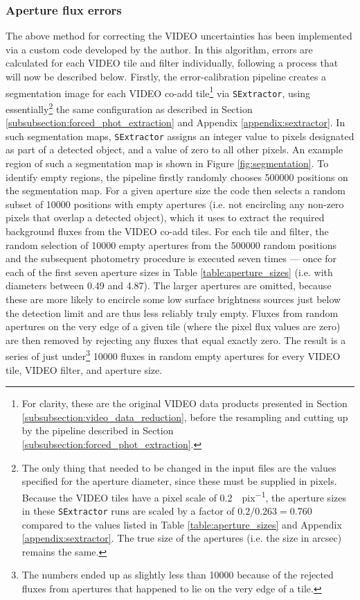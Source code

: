 \subsubsection{Aperture flux errors}\label{subsubsection:aperture_flux_errors}
The above method for correcting the VIDEO uncertainties has been implemented via a custom code developed by the author. In this algorithm, errors are calculated for each VIDEO tile and filter individually, following a process that will now be described below. Firstly, the error-calibration pipeline creates a segmentation image for each VIDEO co-add tile\footnote{For clarity, these are the original VIDEO data products presented in Section \ref{subsubsection:video_data_reduction}, before the resampling and cutting up by the \DESVIDEO pipeline described in Section \ref{subsubsection:forced_phot_extraction}.} via \texttt{SExtractor}, using essentially\footnote{The only thing that needed to be changed in the input files are the values specified for the aperture diameter, since these must be supplied in pixels. Because the VIDEO tiles have a pixel scale of \SI{0.2}{\arcsec.pix^{-1}}, the aperture sizes in these  \texttt{SExtractor} runs are scaled by a factor of $0.2/0.263=0.760$ compared to the values listed in Table \ref{table:aperture_sizes} and Appendix \ref{appendix:sextractor}. The true size of the apertures (i.e. the size in arcsec) remains the same.} the same configuration as described in Section \ref{subsubsection:forced_phot_extraction} and Appendix \ref{appendix:sextractor}.  In such segmentation maps, \texttt{SExtractor} assigns an integer value to pixels designated as part of a detected object, and a value of zero to all other pixels. An example region of such a segmentation map is shown in Figure \ref{fig:segmentation}. To identify empty regions, the pipeline firstly randomly chooses \num{500000} positions on the segmentation map. For a given aperture size the code then selects a random subset of \num{10000} positions with empty apertures (i.e. not encircling any non-zero pixels that overlap a detected object), which it uses to extract the required background fluxes from the VIDEO co-add tiles. For each tile and filter, the random selection of \num{10000} empty apertures from the \num{500000} random positions and the subsequent photometry procedure is executed seven times --- once for each of the first seven aperture sizes in Table \ref{table:aperture_sizes} (i.e. with diameters between \SI{0.49}{\arcsec} and \SI{4.87}{\arcsec}). The larger apertures are omitted, because these are more likely to encircle some low surface brightness sources just below the detection limit and are thus less reliably truly empty. Fluxes from random apertures on the very edge of a given tile (where the pixel flux values are zero) are then removed by rejecting any fluxes that equal exactly zero. The result is a series of just under\footnote{The numbers ended up as slightly less than \num{10000} because of the rejected fluxes from apertures that happened to lie on the very edge of a tile.} \num{10000} fluxes in random empty apertures for every VIDEO tile, VIDEO filter, and aperture size. \par

